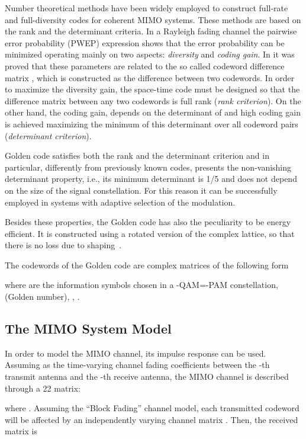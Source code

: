 \documentclass[12pt,onecolumn,draftclsnofoot]{IEEEtran}
\begin{document}
Number theoretical methods have been widely employed to construct
full-rate and full-diversity codes for coherent MIMO systems. These
methods are based on the rank and the determinant criteria. In a
Rayleigh fading channel the pairwise error probability (PWEP)
expression \cite{Criterion} shows that the error probability can be
minimized operating mainly on two aspects: {\em diversity} and {\em
coding gain}. In \cite{Criterion} it was proved that these
parameters are related to the so called codeword difference matrix
, which is constructed as the difference between two
codewords. In order to maximize the diversity gain, the space-time
code must be designed so that the difference matrix between any two
codewords is full rank (\emph {rank criterion}). On the other hand,
the coding gain, depends on the determinant of 
and high coding gain is achieved maximizing the minimum of this
determinant over all codeword pairs (\emph{determinant
criterion}).

Golden code satisfies both the rank and the determinant criterion
and in particular, differently from previously known codes, presents
the non-vanishing determinant property, i.e., its minimum
determinant is 1/5 and does not depend on the size of the signal
constellation. For this reason it can be successfully employed in
systems with adaptive selection of the modulation.

Besides these properties, the Golden code has also the peculiarity
to be energy efficient. It is constructed using a rotated version of
the   complex lattice, so that there is no loss due
to shaping~\cite{Golden1}.

The codewords  of the Golden code are  complex
matrices of the following form 



\noindent where  are the information symbols chosen in a -QAM=-PAM constellation,
 (Golden number), , \cite{GoldenPage}.


\subsection{The  MIMO System Model}
In order to model the 
MIMO channel, its impulse response can be used. Assuming
 as the time-varying channel fading coefficients between the
-th transmit antenna and the -th receive antenna, the
MIMO channel is described through a 22 matrix:



\noindent where .
Assuming the ``Block Fading'' channel model, each transmitted codeword will be
affected by an independently varying channel matrix .
Then, the  received matrix is
\end{document}
